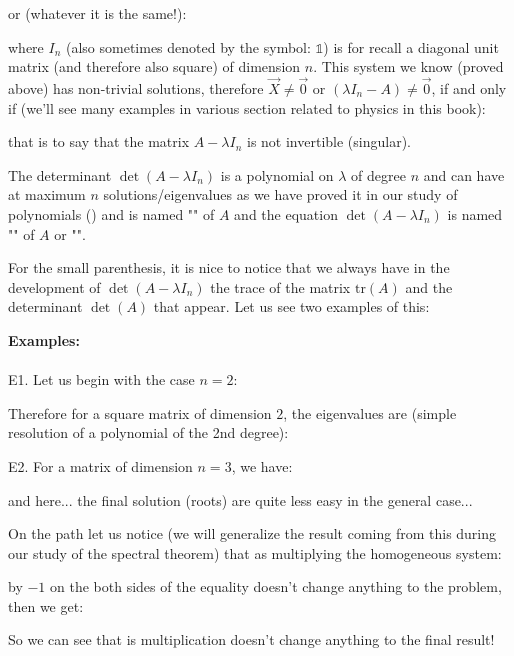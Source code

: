 	or (whatever it is the same!):
	
	where $I_n$ (also sometimes denoted by the symbol: $\mathds{1}$) is for recall a diagonal unit matrix (and therefore also square) of dimension $n$. This system we know (proved above) has non-trivial solutions, therefore $\vec{X} \neq\vec{0}$ or $(\lambda I_n-A)\neq \vec{0}$, if and only if (we'll see many examples in various section related to physics in this book):
	
	that is to say that the matrix $A-\lambda I_n$ is not invertible (singular).
	
	The determinant $\det(A-\lambda I_n)$ is a polynomial on $\lambda$ of degree $n$ and can have at maximum $n$ solutions/eigenvalues as we have proved it in our study of polynomials () and is named "\label{characteristic polynomial determinant}" of $A$ and the equation $\det(A-\lambda I_n)$ is named "" of $A$ or "\label{eigenvalue equations}".
	
	For the small parenthesis, it is nice to notice that we always have in the development of $\det(A-\lambda I_n)$ the trace of the matrix $\text{tr}(A)$ and the determinant $\det (A)$ that appear. Let us see two examples of this:
	
	\begin{tcolorbox}[colframe=black,colback=white,sharp corners]
	\textbf{{\Large {}}Examples:}\\\\
	E1. Let us begin with the case $n=2$:
	
	Therefore for a square matrix of dimension $2$, the eigenvalues are (simple resolution of a polynomial of the 2nd degree):
	
	E2. For a matrix of dimension $n=3$, we have:
	
	and here... the final solution (roots) are quite less easy in the general case...
	\end{tcolorbox}
	On the path let us notice (we will generalize the result coming from this during our study of the spectral theorem) that as multiplying the homogeneous system:
	
	by $-1$ on the both sides of the equality doesn't change anything to the problem, then we get:
	
	So we can see that is multiplication doesn't change anything to the final result!
	
